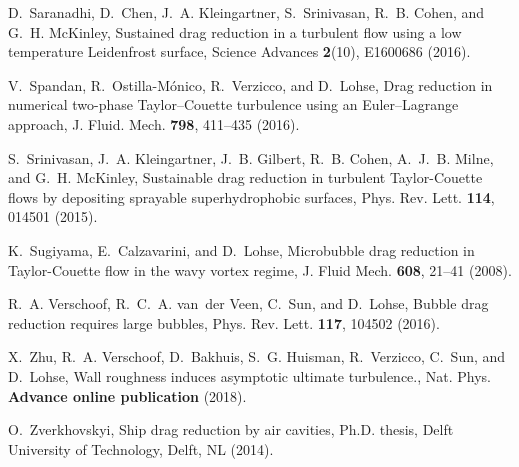 \documentclass[aps,onecolumn,10pt, floatfix, superscriptaddress,longbibliography, pra]{revtex4-1}
\begin{document}
\begin{thebibliography}{44}
D.~Saranadhi, D.~Chen, J.~A. Kleingartner, S.~Srinivasan, R.~B. Cohen, and
  G.~H. McKinley, Sustained drag reduction in a turbulent flow using a low
  temperature {Leidenfrost} surface, {Science Advances} \textbf{2}(10),
  E1600686 (2016).

V.~Spandan, R.~Ostilla-M\'{o}nico, R.~Verzicco, and D.~Lohse, {Drag reduction
  in numerical two-phase Taylor--Couette turbulence using an Euler--Lagrange
  approach}, {J. Fluid. Mech.} \textbf{798}, 411--435 (2016).

S.~Srinivasan, J.~A. Kleingartner, J.~B. Gilbert, R.~B. Cohen, A.~J.~B. Milne,
  and G.~H. McKinley, Sustainable drag reduction in turbulent {Taylor-Couette}
  flows by depositing sprayable superhydrophobic surfaces, {Phys. Rev. Lett.}
  \textbf{114}, 014501 (2015).

K.~Sugiyama, E.~Calzavarini, and D.~Lohse, Microbubble drag reduction in
  {{Taylor-Couette}} flow in the wavy vortex regime, J. Fluid Mech.
  \textbf{608}, 21--41 (2008).

R.~A. Verschoof, R.~C.~A. van~der Veen, C.~Sun, and D.~Lohse, {Bubble drag
  reduction requires large bubbles}, {Phys. Rev. Lett.} \textbf{117}, 104502
  (2016).

X.~Zhu, R.~A. Verschoof, D.~Bakhuis, S.~G. Huisman, R.~Verzicco, C.~Sun, and
  D.~Lohse, Wall roughness induces asymptotic ultimate turbulence., Nat. Phys.
  \textbf{Advance online publication} (2018).

O.~Zverkhovskyi, Ship drag reduction by air cavities, Ph.D. thesis, Delft
  University of Technology, Delft, NL (2014).

\end{thebibliography}
\end{document}
